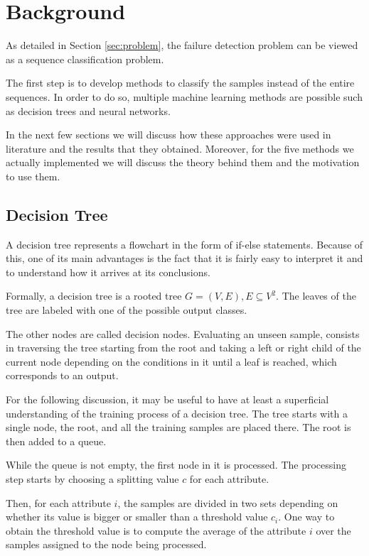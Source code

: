 \chapter{Background}\label{chap:background}

As detailed in Section \ref{sec:problem}, the failure detection problem can be viewed as a sequence classification problem.

The first step is to develop methods to classify the samples instead of the entire sequences.
In order to do so, multiple machine learning methods are possible such as decision trees and neural networks.

In the next few sections we will discuss how these approaches were used in literature and the results that they obtained.
Moreover, for the five methods we actually implemented we will discuss the theory behind them and the motivation to use them.

\section{Decision Tree}\label{sec:decisiontree}

A decision tree represents a flowchart in the form of if-else statements.
Because of this, one of its main advantages is the fact that it is fairly easy to interpret it and to understand how it arrives at its conclusions.

Formally, a decision tree is a rooted tree $G = (V, E), E \subseteq V^2$.
The leaves of the tree are labeled with one of the possible output classes.

The other nodes are called decision nodes.
Evaluating an unseen sample, consists in traversing the tree starting from the root and taking a left or right child of the current node depending on the conditions in it until a leaf is reached, which corresponds to an output.

For the following discussion, it may be useful to have at least a superficial understanding of the training process of a decision tree.
The tree starts with a single node, the root, and all the training samples are placed there.
The root is then added to a queue.

While the queue is not empty, the first node in it is processed.
The processing step starts by choosing a splitting value $c$ for each attribute.

Then, for each attribute $i$, the samples are divided in two sets depending on whether its value is bigger or smaller than a threshold value $c_i$.
One way to obtain the threshold value is to compute the average of the attribute $i$ over the samples assigned to the node being processed.

